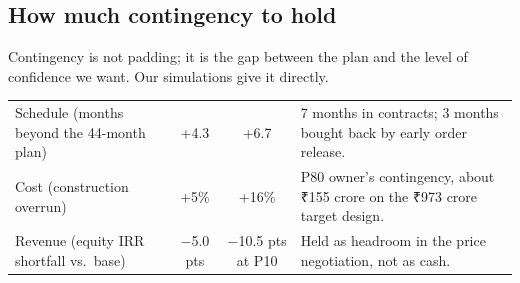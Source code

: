 \subsection{How much contingency to hold}
Contingency is not padding; it is the gap between the plan and the level of confidence we want. Our simulations give it directly.
\begin{center}\tablefont
\begin{tabularx}{\textwidth}{@{}L c c L@{}}
\toprule
{} &  &  & \\ \midrule
Schedule (months beyond the 44-month plan) & +4.3 & +6.7 & 7 months in contracts; 3 months bought back by early order release.\\
Cost (construction overrun) & +5\% & +16\% & P80 owner's contingency, about ₹155 crore on the ₹973 crore target design.\\
Revenue (equity IRR shortfall vs.\ base) & $-$5.0 pts & $-$10.5 pts at P10 & Held as headroom in the price negotiation, not as cash.\\
\bottomrule
\end{tabularx}
\end{center}
\newpage
